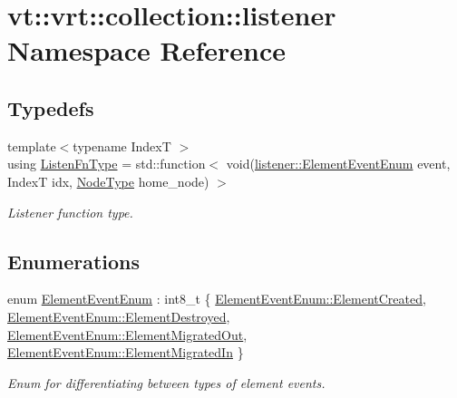 \hypertarget{namespacevt_1_1vrt_1_1collection_1_1listener}{}\section{vt\+:\+:vrt\+:\+:collection\+:\+:listener Namespace Reference}
\label{namespacevt_1_1vrt_1_1collection_1_1listener}
\subsection*{Typedefs}
\begin{DoxyCompactItemize}
\item 
{\footnotesize template$<$typename IndexT $>$ }\\using \hyperlink{namespacevt_1_1vrt_1_1collection_1_1listener_a0f35a1b6c7c88d9543939a204f418d7a}{Listen\+Fn\+Type} = std\+::function$<$ void(\hyperlink{namespacevt_1_1vrt_1_1collection_1_1listener_a96ace4b58b3d91759e7abda5cc33b012}{listener\+::\+Element\+Event\+Enum} event, IndexT idx, \hyperlink{namespacevt_a866da9d0efc19c0a1ce79e9e492f47e2}{Node\+Type} home\+\_\+node) $>$
\begin{DoxyCompactList}\small\item\em Listener function type. \end{DoxyCompactList}\end{DoxyCompactItemize}
\subsection*{Enumerations}
\begin{DoxyCompactItemize}
\item 
enum \hyperlink{namespacevt_1_1vrt_1_1collection_1_1listener_a96ace4b58b3d91759e7abda5cc33b012}{Element\+Event\+Enum} \+: int8\+\_\+t \{ \hyperlink{namespacevt_1_1vrt_1_1collection_1_1listener_a96ace4b58b3d91759e7abda5cc33b012a13f83c592fd326a19a0b4e5196bcbc27}{Element\+Event\+Enum\+::\+Element\+Created}, 
\hyperlink{namespacevt_1_1vrt_1_1collection_1_1listener_a96ace4b58b3d91759e7abda5cc33b012a74a4ebfb91a5d2efd17810fcf21b0d6a}{Element\+Event\+Enum\+::\+Element\+Destroyed}, 
\hyperlink{namespacevt_1_1vrt_1_1collection_1_1listener_a96ace4b58b3d91759e7abda5cc33b012a83a275aac9439b3fe0cff1b3f685d14d}{Element\+Event\+Enum\+::\+Element\+Migrated\+Out}, 
\hyperlink{namespacevt_1_1vrt_1_1collection_1_1listener_a96ace4b58b3d91759e7abda5cc33b012a52681015b599c7461eeea5c717df6a25}{Element\+Event\+Enum\+::\+Element\+Migrated\+In}
 \}\begin{DoxyCompactList}\small\item\em Enum for differentiating between types of element events. \end{DoxyCompactList}
\end{DoxyCompactItemize}


